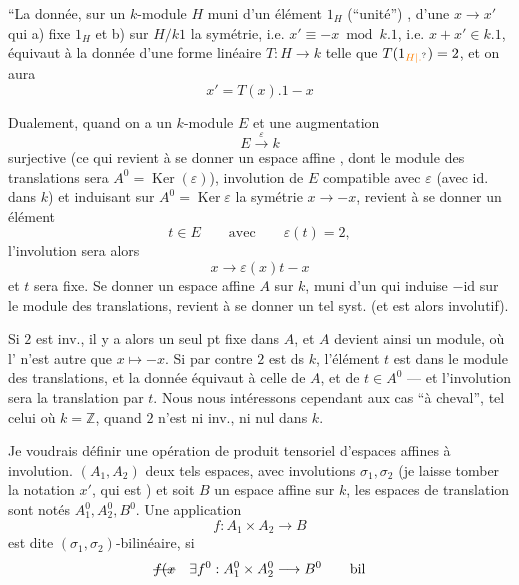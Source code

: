 ``La donnée, sur un $k$-module $H$ muni d'un élément $1_H$ (``unité'') , d'une   $x\longrightarrow x'$ qui a) fixe $1_H$ et b)  sur $H/k1$ la symétrie, i.e. $x'\equiv-x\bmod k.1$, i.e. $x+x'\in k.1$, équivaut à la donnée d'une forme linéaire $T:H\longrightarrow k$ telle que $T(1_{\unsure{H|.}})=2$, et on aura
\[
 x'=T(x).1-x
\]

Dualement,  quand on a un $k$-module $E$ et une augmentation
\[
 E\xrightarrow{\varepsilon} k
\]
surjective (ce qui revient à se donner un espace affine , dont le module des translations sera $A^0=\operatorname{Ker}(\varepsilon)$),   involution de $E$ compatible avec $\varepsilon$ (avec id. dans $k$) et induisant sur $A^0=\operatorname{Ker}\varepsilon$ la symétrie $x\longrightarrow-x$, revient à se donner un élément
\[
 t\in E\qquad\text{avec}\qquad\varepsilon(t)=2,
\]
l'involution sera alors
\[
 x\longrightarrow\varepsilon(x)t-x
\]
et $t$ sera fixe. Se donner un espace affine $A$ sur $k$, muni d'un   qui induise $-\mathrm{id}$ sur le module des translations, revient à se donner un tel syst. (et   est alors involutif).

Si $2$ est inv., il y a alors un seul pt fixe dans $A$, et $A$ devient ainsi un module, où l' n'est autre que $x\mapsto-x$. Si par contre $2$ est   ds $k$,  l'élément $t$ est dans le module des translations, et la donnée équivaut à celle de $A$, et de $t\in A^0$ --- et l'involution sera la translation par $t$. Nous nous intéressons cependant aux cas ``à cheval'', tel celui où $k=\mathbb Z$, quand $2$ n'est ni inv., ni nul dans $k$. 

Je voudrais définir une opération de produit tensoriel d'espaces affines à involution.  $(A_1,A_2)$ deux tels espaces, avec involutions $\sigma_1,\sigma_2$ (je laisse tomber la notation $x'$, qui est  ) et soit $B$ un espace affine sur $k$, les espaces de translation sont notés $A_1^0,A_2^0,B^0$.
Une application
\[
 f:A_1\times A_2\longrightarrow B
\]
est dite  $(\sigma_1,\sigma_2)$-bilinéaire, si \deleted{$\unsure{\exists!|\exists}$}
\[
 \deleted{f(x}\quad\exists f^0:A_1^0\times A_2^0\longrightarrow B^0\qquad\text{bil}
\]

